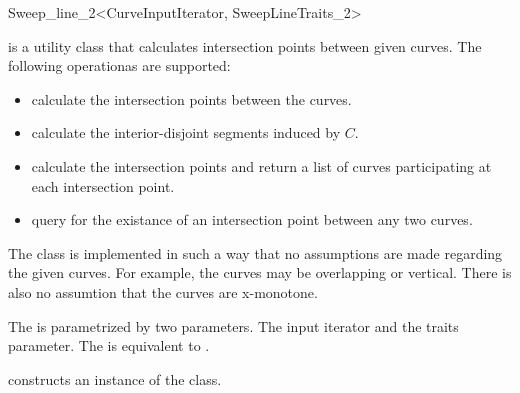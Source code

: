 
\ccRefPageBegin



\begin{ccRefClass}{Sweep_line_2<CurveInputIterator, SweepLineTraits_2>}
\label{SL_sec:sl}
    
\ccDefinition
     is a utility class that calculates 
    intersection
    points between given curves. The following operationas are supported:

\begin{itemize}
\item calculate the intersection points between the curves.
\item calculate the interior-disjoint segments induced by $C$.
\item calculate the intersection points and return a list of curves 
participating at each intersection point.
\item query for the existance of an intersection point between any two curves.
\end{itemize}

The  class is implemented in such a way that no
assumptions are made regarding the given curves. For example, the curves may
be overlapping or vertical. There is also no assumtion that the curves are
x-monotone.

The  is parametrized by two parameters. The input 
iterator and  the traits parameter. The 
 is equivalent to 
.


\ccCreation
    
   {constructs an instance of the  class.}
    

\end{ccRefClass}
